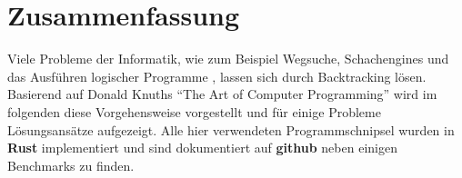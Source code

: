 \chapter*{Zusammenfassung}

Viele Probleme der Informatik, wie zum Beispiel Wegsuche, Schachengines und 
das Ausführen logischer Programme \cite[p. ~19]{DBLP:journals/jlp/SomogyiHC96}, lassen sich durch Backtracking lösen.
Basierend auf Donald Knuths "`The Art of Computer Programming"'\cite{TAOCP} wird im folgenden diese Vorgehensweise 
vorgestellt und für einige Probleme Lösungsansätze aufgezeigt. Alle hier verwendeten Programmschnipsel wurden in \textbf{Rust} implementiert und sind
dokumentiert auf \textbf{github}\cite{Kauschke} neben einigen Benchmarks zu finden.
